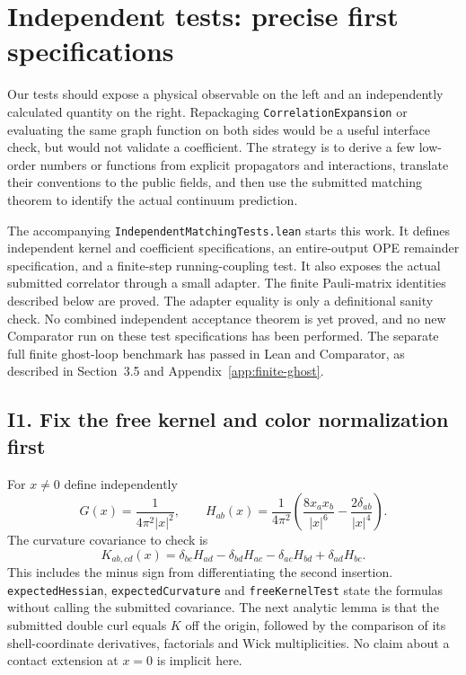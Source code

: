 \documentclass[11pt]{article}
\newcommand{\code}[1]{{\small\nolinkurl{#1}}}
\begin{document}
\section{Independent tests: precise first specifications}
\label{sec:independent}

Our tests should expose a physical observable on the left and an
independently calculated quantity on the right. Repackaging
\code{CorrelationExpansion} or evaluating the same graph function
on both sides would be a useful interface check, but would not
validate a coefficient. The strategy is to derive a few low-order
numbers or functions from explicit propagators and interactions,
translate their conventions to the public fields, and then use
the submitted matching theorem to identify the actual continuum
prediction.

The accompanying \code{IndependentMatchingTests.lean} starts this
work. It defines independent kernel and coefficient specifications,
an entire-output OPE remainder specification, and a finite-step
running-coupling test. It also exposes the actual submitted
correlator through a small adapter. The finite Pauli-matrix
identities described below are proved. The adapter equality is
only a definitional sanity check. No combined independent acceptance
theorem is yet proved, and no new Comparator run on these test
specifications has been performed. The separate full finite ghost-loop
benchmark has passed in Lean and Comparator, as described in
Section~3.5 and Appendix~\ref{app:finite-ghost}.

\subsection{I1. Fix the free kernel and color normalization first}

For $x\ne0$ define independently
\[
 G(x)=\frac{1}{4\pi^2|x|^2},\qquad
 H_{ab}(x)=\frac{1}{4\pi^2}
 \left(\frac{8x_ax_b}{|x|^6}-\frac{2\delta_{ab}}{|x|^4}\right).
\]
The curvature covariance to check is
\[
 K_{ab,cd}(x)=\delta_{bc}H_{ad}-\delta_{bd}H_{ac}
             -\delta_{ac}H_{bd}+\delta_{ad}H_{bc}.
\]
This includes the minus sign from differentiating the second
insertion. \code{expectedHessian}, \code{expectedCurvature} and
\code{freeKernelTest} state the formulas without calling the
submitted covariance. The next analytic lemma is that the
submitted double curl equals $K$ off the origin, followed by
the comparison of its shell-coordinate derivatives, factorials
and Wick multiplicities. No claim about a contact extension
at $x=0$ is implicit here.
\end{document}
